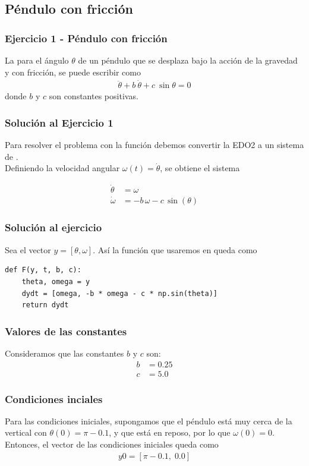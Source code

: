 \subsection{Péndulo con fricción}
\begin{frame}
\frametitle{Ejercicio 1 - Péndulo con fricción}
La  para el ángulo $\theta$ de un péndulo que se desplaza bajo la acción de la gravedad y con fricción, se puede escribir como
\begin{align}
\ddot{\theta} +  b \: \dot{\theta} +  c \: \sin \theta = 0
\end{align}
donde $b$ y $c$ son constantes positivas.
\end{frame}
\begin{frame}
\frametitle{Solución al Ejercicio 1}
Para resolver el problema con la función  debemos convertir la EDO2 a un sistema de .
\\
\bigskip
Definiendo la velocidad angular $\omega (t) = \dot{\theta}$, se obtiene el sistema
\begin{center}
\begin{align*}
\dot{\theta} &= \omega \\
\dot{\omega} &= -b \, \omega - c \, \sin(\theta)
\end{align*}
\end{center}
\end{frame}
\begin{frame}[fragile]
\frametitle{Solución al ejercicio}
Sea el vector $y =  [\theta, \omega]$. Así la función que usaremos en \python{} queda como
\begin{lstlisting}[caption=Función a integrar para el problema del péndulo, style=codigopython]
def F(y, t, b, c):
    theta, omega = y
    dydt = [omega, -b * omega - c * np.sin(theta)]
    return dydt
\end{lstlisting}
\end{frame}
\begin{frame}
\frametitle{Valores de las constantes}
Consideramos que las constantes $b$ y $c$ son:
\begin{align*}
b &= 0.25 \\
c &= 5.0
\end{align*} 
\end{frame}
\begin{frame}
\frametitle{Condiciones inciales}
Para las condiciones iniciales, supongamos que el péndulo está muy cerca de la vertical con $\theta(0) = \pi - 0.1$, y que está en reposo, por lo que $\omega(0) = 0$.
\\
\bigskip
Entonces, el vector de las condiciones iniciales queda como
\begin{align*}
y0 =  [\pi - 0.1 , \; 0.0] 
\end{align*}
\end{frame}
